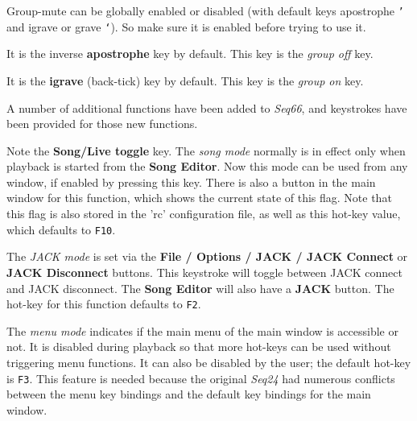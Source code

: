    Group-mute can be globally enabled or disabled (with default keys apostrophe
   \texttt{'}   and igrave or grave \texttt{`}).
   So make sure it is enabled before trying to use it.

   It is the inverse \textbf{apostrophe} key by default.
   This key is the \textsl{group off} key.

   It is the \textbf{igrave} (back-tick) key by default.
   This key is the \textsl{group on} key.

   A number of additional functions have been added to \textsl{Seq66},
   and keystrokes have been provided for those new functions.

   \setcounter{ItemCounter}{0}      %

   Note the \textbf{Song/Live toggle} key.
   The \textsl{song mode} normally is in effect only when playback is started
   from the \textbf{Song Editor}.  Now this mode can be used from any
   window, if enabled by pressing this key.  There is also
   a button in the main window for this function, which shows the current state
   of this flag.  Note that this flag is also stored in the 'rc' configuration
   file, as well as this hot-key value, which defaults to \texttt{F10}.

   The \textsl{JACK mode} is set via the
   \textbf{File / Options / JACK / JACK Connect} or 
   \textbf{JACK Disconnect} buttons.
   This keystroke will toggle between JACK connect and JACK disconnect.
   The \textbf{Song Editor} will also have a \textbf{JACK} button.
   The hot-key for this function defaults to \texttt{F2}.

   The \textsl{menu mode} indicates if the main menu of the
   main window is accessible or not.  It is disabled during playback
   so that more hot-keys can be used without triggering menu functions.
   It can also be disabled by the user; the default hot-key is \texttt{F3}.
   This feature is needed because the original \textsl{Seq24} had numerous
   conflicts between the menu key bindings and the default key bindings for the
   main window.

